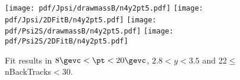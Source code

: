\begin{figure}[H]
\begin{center}
\texttt{[image: pdf/Jpsi/drawmassB/n4y2pt5.pdf]}
\texttt{[image: pdf/Jpsi/2DFitB/n4y2pt5.pdf]}
\vspace*{-0.5cm}
\texttt{[image: pdf/Psi2S/drawmassB/n4y2pt5.pdf]}
\texttt{[image: pdf/Psi2S/2DFitB/n4y2pt5.pdf]}
\vspace*{-0.5cm}
\end{center}
\caption{Fit results in $8\gevc<\pt<20\gevc$, $2.8<y<3.5$ and 22$\leq$nBackTracks$<$30.}
\label{Fitn4y2pt5}
\end{figure}
